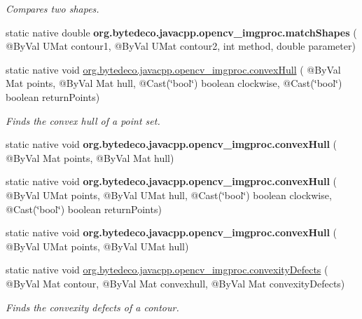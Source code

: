 \begin{DoxyCompactItemize}
\begin{DoxyCompactList}\small\item\em Compares two shapes. \end{DoxyCompactList}\item 
\mbox{\label{group__imgproc__shape_ga802fec5d9e13b63c134ade0e920fe7cb}} 
static native double {\bfseries org.\+bytedeco.\+javacpp.\+opencv\+\_\+imgproc.\+match\+Shapes} ( @By\+Val U\+Mat contour1, @By\+Val U\+Mat contour2, int method, double parameter)
\item 
static native void \hyperlink{group__imgproc__shape_gad55038a508ccdb2a51346a9321039983}{org.\+bytedeco.\+javacpp.\+opencv\+\_\+imgproc.\+convex\+Hull} ( @By\+Val Mat points, @By\+Val Mat hull, @Cast(\char`\"{}bool\char`\"{}) boolean clockwise, @Cast(\char`\"{}bool\char`\"{}) boolean return\+Points)
\begin{DoxyCompactList}\small\item\em Finds the convex hull of a point set. \end{DoxyCompactList}\item 
\mbox{\label{group__imgproc__shape_ga3ca5756bf3c700d741f008a5ee28f49a}} 
static native void {\bfseries org.\+bytedeco.\+javacpp.\+opencv\+\_\+imgproc.\+convex\+Hull} ( @By\+Val Mat points, @By\+Val Mat hull)
\item 
\mbox{\label{group__imgproc__shape_gac7226745217acd7ef4d6298ef30c0600}} 
static native void {\bfseries org.\+bytedeco.\+javacpp.\+opencv\+\_\+imgproc.\+convex\+Hull} ( @By\+Val U\+Mat points, @By\+Val U\+Mat hull, @Cast(\char`\"{}bool\char`\"{}) boolean clockwise, @Cast(\char`\"{}bool\char`\"{}) boolean return\+Points)
\item 
\mbox{\label{group__imgproc__shape_gad3606f6f4a3d715eeb5ecb41e95b6e3e}} 
static native void {\bfseries org.\+bytedeco.\+javacpp.\+opencv\+\_\+imgproc.\+convex\+Hull} ( @By\+Val U\+Mat points, @By\+Val U\+Mat hull)
\item 
static native void \hyperlink{group__imgproc__shape_ga5947a188964bc225faa41c8281dd16a4}{org.\+bytedeco.\+javacpp.\+opencv\+\_\+imgproc.\+convexity\+Defects} ( @By\+Val Mat contour, @By\+Val Mat convexhull, @By\+Val Mat convexity\+Defects)
\begin{DoxyCompactList}\small\item\em Finds the convexity defects of a contour. \end{DoxyCompactList}\item 

\end{DoxyCompactItemize}
